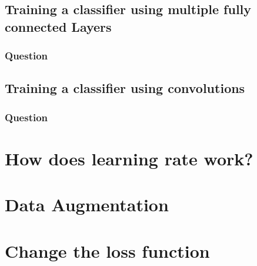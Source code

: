 \documentclass[12pt]{article}
\begin{document}
\subsection{Training a classifier using multiple fully connected Layers}
\subsubsection{Question}

\subsection{Training a classifier using convolutions}
\subsubsection{Question}

\section{How does learning rate work?}

\section{Data Augmentation}

\section{Change the loss function}
\end{document}
